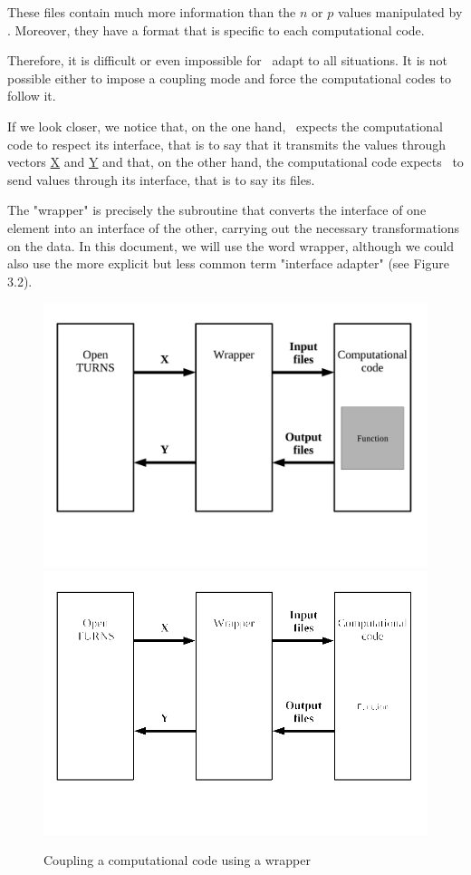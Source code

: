 These files contain much more information than the $n$ or $p$ values manipulated by \OT. Moreover, they have a format that is specific to each computational code.

Therefore, it is difficult or even impossible for \OT\ adapt to all situations. It is not possible either to impose a coupling mode and force the computational codes to follow it.

If we look closer, we notice that, on the one hand, \OT\ expects the computational code to respect its interface, that is to say that it transmits the values through vectors \underline{X} and \underline{Y} and that, on the other hand, the computational code expects \OT\ to send values through its interface, that is to say its files.

The "wrapper" is precisely the subroutine that converts the interface of one element into an interface of the other, carrying out the necessary transformations on the data. In this document, we will use the word wrapper, although we could also use the more explicit but less common term "interface adapter" (see Figure 3.2).

\begin{figure}
  \begin{center}
    \ifpdf
    \includegraphics[width=12cm]{Figure2.pdf}
    \else
    \includegraphics[width=12cm]{Figure2.png}
    \fi
    \caption[Figure 2]{Coupling a computational code using a wrapper}
  \end{center}
\end{figure}

